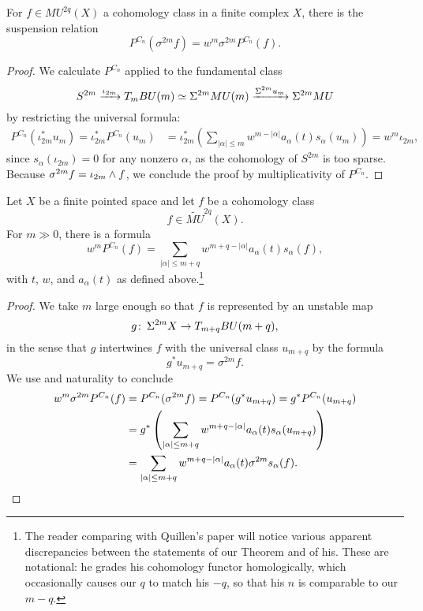 \begin{lemma}\label{PowerOpnsOnSuspensions}
For \(f \in MU^{2q}(X)\) a cohomology class in a finite complex \(X\), there is the suspension relation \[P^{C_n}(\sigma^{2m} f) = w^m \sigma^{2m} P^{C_n}(f).\]
\end{lemma}
\begin{proof}
We calculate \(P^{C_n}\) applied to the fundamental class \[S^{2m} \xrightarrow{\iota_{2m}} T_m BU(m) \simeq \Sigma^{2m} MU(m) \xrightarrow{\Sigma^{2m} u_m} \Sigma^{2m} MU\] by restricting the universal formula:
\begin{align*}
P^{C_n}(\iota_{2m}^* u_m) = \iota_{2m}^* P^{C_n}(u_m) & = \iota_{2m}^* \left( \sum_{|\alpha| \le m} w^{m - |\alpha|} a_\alpha(t) s_\alpha(u_m) \right) = w^m \iota_{2m},
\end{align*}
since \(s_\alpha(\iota_{2m}) = 0\) for any nonzero \(\alpha\), as the cohomology of \(S^{2m}\) is too sparse.  Because \(\sigma^{2m} f = \iota_{2m} \wedge f\), we conclude the proof by multiplicativity of \(P^{C_n}\).
\end{proof}

\begin{theorem}\label{QuillensKeyRelation}
Let \(X\) be a finite pointed space and let \(f\) be a cohomology class \[f \in \widetilde{MU}^{2q}(X).\]  For \(m \gg 0\), there is a formula \[w^m P^{C_n}(f) = \sum_{|\alpha| \le m+q} w^{m+q - |\alpha|} a_\alpha(t) s_\alpha(f),\] with \(t\), \(w\), and \(a_\alpha(t)\) as defined above.\footnote{The reader comparing with Quillen's paper will notice various apparent discrepancies between the statements of our Theorem and of his.  These are notational: he grades his cohomology functor homologically, which occasionally causes our \(q\) to match his \(-q\), so that his \(n\) is comparable to our \(m-q\).}
\end{theorem}
\begin{proof}
We take \(m\) large enough so that \(f\) is represented by an unstable map \[g\colon\thinspace \Sigma^{2m} X \to T_{m+q} BU(m+q),\] in the sense that \(g\) intertwines \(f\) with the universal class \(u_{m+q}\) by the formula \[g^* u_{m+q} = \sigma^{2m} f.\]  We use  and naturality to conclude
\begin{align*}
w^m \sigma^{2m} P^{C_n}(f) & = P^{C_n}(\sigma^{2m} f) = P^{C_n}(g^* u_{m+q}) = g^* P^{C_n}(u_{m+q}) \\
& = g^* \left(\sum_{|\alpha| \le m+q} w^{m+q - |\alpha|} a_\alpha(t) s_\alpha(u_{m+q}) \right) \\
& = \sum_{|\alpha| \le m+q} w^{m+q - |\alpha|} a_\alpha(t) \sigma^{2m} s_\alpha(f). \qedhere
\end{align*}
\end{proof}

